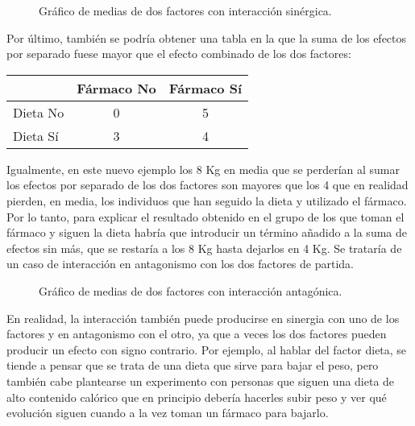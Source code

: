 \begin{figure}[h!]
\begin{center}
\scalebox{0.8}{}
\caption{Gráfico de medias de dos factores con interacción sinérgica.}
\end{center}
\end{figure}

Por último, también se podría obtener una tabla en la que la suma de los efectos por separado fuese mayor que el efecto combinado de los dos
factores:

\begin{center}
\begin{tabular}{|l|c|c|}
\cline{2-3}
\multicolumn{1}{c|}{} & Fármaco No & Fármaco Sí \\
\hline
Dieta No & 0 & 5 \\
\hline
Dieta Sí & 3 & 4 \\
\hline
\end{tabular}
\end{center}

Igualmente, en este nuevo ejemplo los 8 Kg en media que se perderían al sumar los efectos por separado de los dos
factores son mayores que los 4 que en realidad pierden, en media, los individuos que han seguido la dieta y utilizado el
fármaco. Por lo tanto, para explicar el resultado obtenido en el grupo de los que toman el fármaco y siguen la dieta
habría que introducir un término añadido a la suma de efectos sin más, que se restaría a los 8 Kg hasta dejarlos en 4
Kg. Se trataría de un caso de interacción en antagonismo con los dos factores de partida.

\begin{figure}[h!]
\begin{center}
\scalebox{0.8}{}
\caption{Gráfico de medias de dos factores con interacción antagónica.}
\end{center}
\end{figure}

En realidad, la interacción también puede producirse en sinergia con uno de los factores y en antagonismo con el otro,
ya que a veces los dos factores pueden producir un efecto con signo contrario. Por ejemplo, al hablar del factor dieta,
se tiende a pensar que se trata de una dieta que sirve para bajar el peso, pero también cabe plantearse un experimento
con personas que siguen una dieta de alto contenido calórico que en principio debería hacerles subir peso y ver qué
evolución siguen cuando a la vez toman un fármaco para bajarlo.

